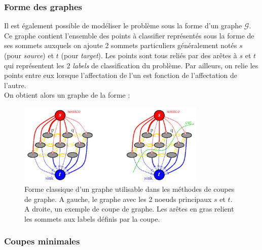 \documentclass{article}
\newcommand{\G}{\mathcal{G}}
\begin{document}
\subsubsection{Forme des graphes}

Il est également possible de modéliser le problème sous la forme d'un graphe $\G$. Ce graphe contient l'ensemble des points à classifier représentés sous la forme de ses sommets auxquels on ajoute 2 sommets particuliers généralement notés $s$ (pour \textit{source}) et $t$ (pour \textit{target}). Les points sont tous reliés par des arêtes à $s$ et $t$ qui représentent les 2 \textit{labels} de classification du problème. Par ailleurs, on relie les points entre eux lorsque l'affectation de l'un est fonction de l'affectation de l'autre.\\
On obtient alors un graphe de la forme : 
\begin{figure}[!h]
	\begin{center}
		\includegraphics[width=0.8\textwidth]{Images/GC/graphcut.png} 
	\end{center}
	\caption{Forme classique d'un graphe utilisable dans les méthodes de coupes de graphe. A gauche, le graphe avec les 2 noeuds principaux $s$ et $t$. A droite, un exemple de coupe de graphe. Les arêtes en gras relient les sommets aux labels définis par la coupe.}
	\label{fig:GC_graphe}
\end{figure}

\subsubsection{Coupes minimales}
\end{document}
